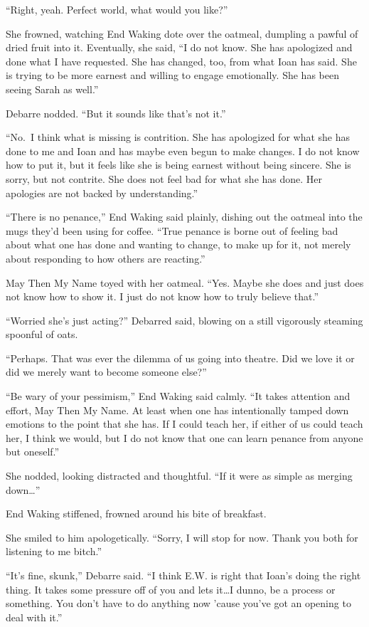 ``Right, yeah. Perfect world, what would you like?''

She frowned, watching End Waking dote over the oatmeal, dumpling a pawful of dried fruit into it. Eventually, she said, ``I do not know. She has apologized and done what I have requested. She has changed, too, from what Ioan has said. She is trying to be more earnest and willing to engage emotionally. She has been seeing Sarah as well.''

Debarre nodded. ``But it sounds like that's not it.''

``No.~I think what is missing is contrition. She has apologized for what she has done to me and Ioan and has maybe even begun to make changes. I do not know how to put it, but it feels like she is being earnest without being sincere. She is sorry, but not contrite. She does not feel bad for what she has done. Her apologies are not backed by understanding.''

``There is no penance,'' End Waking said plainly, dishing out the oatmeal into the mugs they'd been using for coffee. ``True penance is borne out of feeling bad about what one has done and wanting to change, to make up for it, not merely about responding to how others are reacting.''

May Then My Name toyed with her oatmeal. ``Yes. Maybe she does and just does not know how to show it. I just do not know how to truly believe that.''

``Worried she's just acting?'' Debarred said, blowing on a still vigorously steaming spoonful of oats.

``Perhaps. That was ever the dilemma of us going into theatre. Did we love it or did we merely want to become someone else?''

``Be wary of your pessimism,'' End Waking said calmly. ``It takes attention and effort, May Then My Name. At least when one has intentionally tamped down emotions to the point that she has. If I could teach her, if either of us could teach her, I think we would, but I do not know that one can learn penance from anyone but oneself.''

She nodded, looking distracted and thoughtful. ``If it were as simple as merging down\ldots{}''

End Waking stiffened, frowned around his bite of breakfast.

She smiled to him apologetically. ``Sorry, I will stop for now. Thank you both for listening to me bitch.''

``It's fine, skunk,'' Debarre said. ``I think E.W. is right that Ioan's doing the right thing. It takes some pressure off of you and lets it\ldots I dunno, be a process or something. You don't have to do anything now 'cause you've got an opening to deal with it.''

